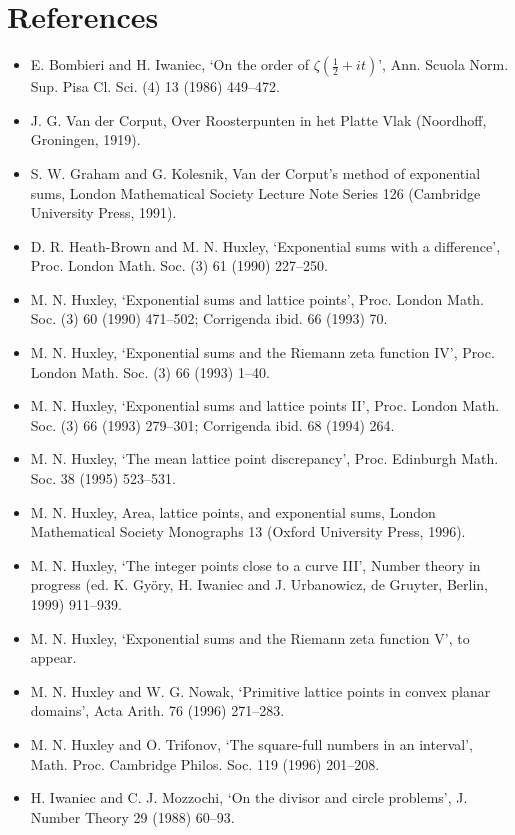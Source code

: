 \documentclass[10pt]{article}
\begin{document}
\section*{References}
\begin{itemize}
  \item[1.] E. Bombieri and H. Iwaniec, `On the order of $\zeta\left(\frac{1}{2}+i t\right)$', Ann. Scuola Norm. Sup. Pisa Cl. Sci. (4) 13 (1986) 449--472.
  \item[2.] J. G. Van der Corput, Over Roosterpunten in het Platte Vlak (Noordhoff, Groningen, 1919).
  \item[3.] S. W. Graham and G. Kolesnik, Van der Corput's method of exponential sums, London Mathematical Society Lecture Note Series 126 (Cambridge University Press, 1991).
  \item[4.] D. R. Heath-Brown and M. N. Huxley, `Exponential sums with a difference', Proc. London Math. Soc. (3) 61 (1990) 227--250.
  \item[5.] M. N. Huxley, `Exponential sums and lattice points', Proc. London Math. Soc. (3) 60 (1990) 471--502; Corrigenda ibid. 66 (1993) 70.
  \item[6.] M. N. Huxley, `Exponential sums and the Riemann zeta function IV', Proc. London Math. Soc. (3) 66 (1993) 1--40.
  \item[7.] M. N. Huxley, `Exponential sums and lattice points II', Proc. London Math. Soc. (3) 66 (1993) 279--301; Corrigenda ibid. 68 (1994) 264.
  \item[8.] M. N. Huxley, `The mean lattice point discrepancy', Proc. Edinburgh Math. Soc. 38 (1995) 523--531.
  \item[9.] M. N. Huxley, Area, lattice points, and exponential sums, London Mathematical Society Monographs 13 (Oxford University Press, 1996).
  \item[10.] M. N. Huxley, `The integer points close to a curve III', Number theory in progress (ed. K. Györy, H. Iwaniec and J. Urbanowicz, de Gruyter, Berlin, 1999) 911--939.
  \item[11.] M. N. Huxley, `Exponential sums and the Riemann zeta function V', to appear.
  \item[12.] M. N. Huxley and W. G. Nowak, `Primitive lattice points in convex planar domains', Acta Arith. 76 (1996) 271--283.
  \item[13.] M. N. Huxley and O. Trifonov, `The square-full numbers in an interval', Math. Proc. Cambridge Philos. Soc. 119 (1996) 201--208.
  \item[14.] H. Iwaniec and C. J. Mozzochi, `On the divisor and circle problems', J. Number Theory 29 (1988) 60--93.

\end{itemize}
\end{document}
